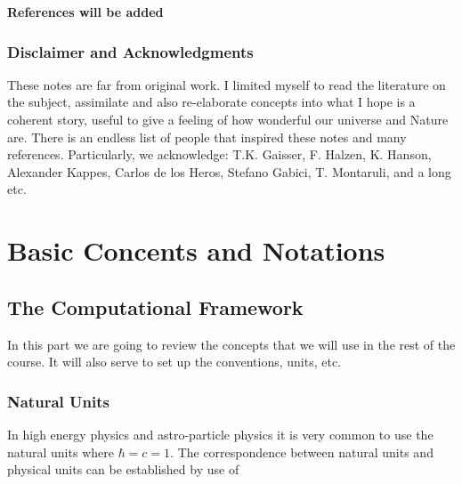\documentclass[
  letterpaper,
  DIV=11,
  numbers=noendperiod]{scrreprt}
\begin{document}
\textbf{References will be added}

\subsection*{Disclaimer and
Acknowledgments}\label{disclaimer-and-acknowledgments}

These notes are far from original work. I limited myself to read the
literature on the subject, assimilate and also re-elaborate concepts
into what I hope is a coherent story, useful to give a feeling of how
wonderful our universe and Nature are. There is an endless list of
people that inspired these notes and many references. Particularly, we
acknowledge: T.K. Gaisser, F. Halzen, K. Hanson, Alexander Kappes,
Carlos de los Heros, Stefano Gabici, T. Montaruli, and a long etc.


\chapter*{Basic Concents and
Notations}\label{basic-concents-and-notations}


\section*{The Computational
Framework}\label{the-computational-framework}


In this part we are going to review the concepts that we will use in the
rest of the course. It will also serve to set up the conventions, units,
etc.

\subsection*{Natural Units}\label{natural-units}

In high energy physics and astro-particle physics it is very common to
use the natural units where \(\hbar = c = 1\). The correspondence
between natural units and physical units can be established by use of
\end{document}
